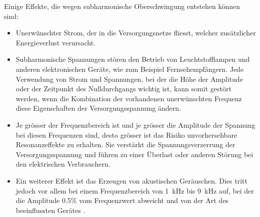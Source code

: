 Einige Effekte, die wegen subharmonische Oberschwingung entstehen können sind:
\begin{itemize}
	\item Unerwünschter Strom, der in die Versorgungsnetze fliesst, welcher zusätzlicher Energieverlust verursacht.
	\item Subharmonische Spannungen stören den Betrieb von Leuchtstofflampen und anderen elektronischen Geräte, wie zum Beispiel Fernsehempfängern. Jede Verwendung von Strom und Spannungen, bei der die Höhe der Amplitude oder der Zeitpunkt des Nulldurchgangs wichtig ist, kann somit gestört werden, wenn die Kombination der vorhandenen unerwünschten Frequenz diese Eigenschaften der Versorgungsspannung ändern.
	\item Je grösser der Frequenzbereich ist und je grösser die Amplitude der Spannung bei diesen Frequenzen sind, desto grösser ist das Risiko unvorhersehbare Resonanzeffekte zu erhalten. Sie verstärkt die Spannungsverzerrung der Versorgungsspannung und führen zu einer Überlast oder anderen Störung bei den elektrischen Verbrauchern.
	\item Ein weiterer Effekt ist das Erzeugen von akustischen Geräuschen. Dies tritt jedoch vor allem bei einem Frequenzbereich von \SI{1}{kHz} bis \SI{9}{kHz} auf, bei der die Amplitude 0.5\% vom Frequenzwert abweicht und von der Art des beeinflussten Gerätes \cite{SpannungsNorm}.
\end{itemize}





        
